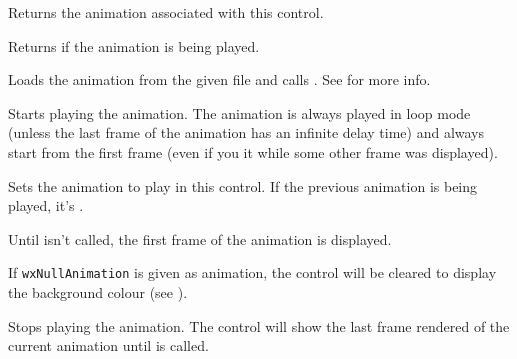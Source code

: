 Returns the animation associated with this control.


\label{wxanimationctrlisplaying}


Returns \true if the animation is being played.


\label{wxanimationctrlloadfile}


Loads the animation from the given file and calls .
See  for more info.


\label{wxanimationctrlplay}


Starts playing the animation.
The animation is always played in loop mode (unless the last frame of the animation
has an infinite delay time) and always start from the first frame
(even if you  it while some other frame was
displayed).


\label{wxanimationctrlsetanimation}


Sets the animation to play in this control.
If the previous animation is being played, it's .

Until  isn't called, the first frame
of the animation is displayed.

If {\tt wxNullAnimation} is given as animation, the control will be cleared to display
the background colour (see ).


\label{wxanimationctrlstop}


Stops playing the animation.
The control will show the last frame rendered of the current animation until  is called.

